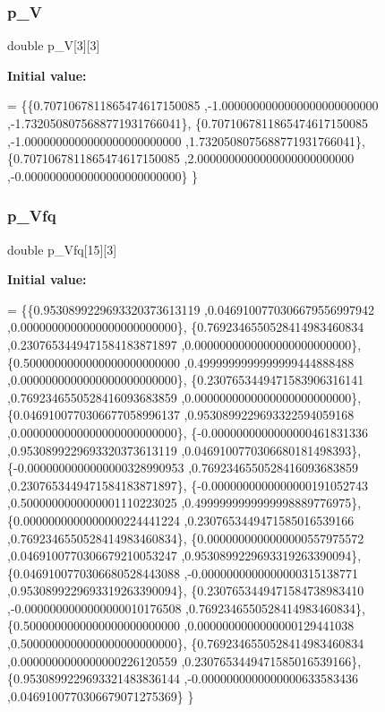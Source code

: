 \subsubsection{\texorpdfstring{p\+\_\+V}{p\_V}}
{\footnotesize\ttfamily double p\+\_\+V\mbox{[}3\mbox{]}\mbox{[}3\mbox{]}}

{\bfseries Initial value\+:}
\begin{DoxyCode}
= \{\{0.7071067811865474617150085 ,-1.0000000000000000000000000 ,-1.7320508075688771931766041\},
\{0.7071067811865474617150085 ,-1.0000000000000000000000000 ,1.7320508075688771931766041\},
\{0.7071067811865474617150085 ,2.0000000000000000000000000 ,-0.0000000000000000000000000\}
\}
\end{DoxyCode}
\mbox{\label{a00446_a1e30e50d0c2f8546d1417b9c45578b7e}} 
\subsubsection{\texorpdfstring{p\+\_\+\+Vfq}{p\_Vfq}}
{\footnotesize\ttfamily double p\+\_\+\+Vfq\mbox{[}15\mbox{]}\mbox{[}3\mbox{]}}

{\bfseries Initial value\+:}
\begin{DoxyCode}
= \{\{0.9530899229693320373613119 ,0.0469100770306679556997942 ,0.0000000000000000000000000\},
\{0.7692346550528414983460834 ,0.2307653449471584183871897 ,0.0000000000000000000000000\},
\{0.5000000000000000000000000 ,0.4999999999999999444888488 ,0.0000000000000000000000000\},
\{0.2307653449471583906316141 ,0.7692346550528416093683859 ,0.0000000000000000000000000\},
\{0.0469100770306677058996137 ,0.9530899229693322594059168 ,0.0000000000000000000000000\},
\{-0.0000000000000000461831336 ,0.9530899229693320373613119 ,0.0469100770306680181498393\},
\{-0.0000000000000000328990953 ,0.7692346550528416093683859 ,0.2307653449471584183871897\},
\{-0.0000000000000000191052743 ,0.5000000000000001110223025 ,0.4999999999999998889776975\},
\{0.0000000000000000224441224 ,0.2307653449471585016539166 ,0.7692346550528414983460834\},
\{0.0000000000000000557975572 ,0.0469100770306679210053247 ,0.9530899229693319263390094\},
\{0.0469100770306680528443088 ,-0.0000000000000000315138771 ,0.9530899229693319263390094\},
\{0.2307653449471584738983410 ,-0.0000000000000000010176508 ,0.7692346550528414983460834\},
\{0.5000000000000000000000000 ,0.0000000000000000129441038 ,0.5000000000000000000000000\},
\{0.7692346550528414983460834 ,0.0000000000000000226120559 ,0.2307653449471585016539166\},
\{0.9530899229693321483836144 ,-0.0000000000000000633583436 ,0.0469100770306679071275369\}
\}
\end{DoxyCode}
\mbox{\label{a00446_a9ca678e47194c4e5ab792cd2e555593d}} 

